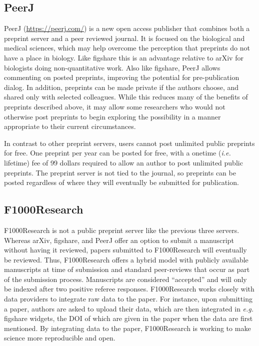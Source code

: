 \documentclass[letterpaper,twocolumn,superscriptaddress,showkeys,longbibliography]{revtex4-1}
\begin{document}
\subsection{PeerJ}

PeerJ (\href{https://peerj.com/}{https://peerj.com/}) is a new open access
publisher that combines both a preprint server and a peer reviewed journal.  It
is focused on the biological and medical sciences, which may help overcome the
perception that preprints do not have a place in biology. Like figshare this is
an advantage relative to arXiv for biologists doing non-quantitative work.  Also
like figshare, PeerJ allows commenting on posted preprints, improving the
potential for pre-publication dialog. In addition, preprints can be made private
if the authors choose, and shared only with selected colleagues. While this
reduces many of the benefits of preprints described above, it may allow some
researchers who would not otherwise post preprints to begin exploring the
possibility in a manner appropriate to their current circumstances.

In contrast to other preprint servers, users cannot post unlimited public
preprints for free. One preprint per year can be posted for free, with a onetime
(\emph{i.e.} lifetime) fee of 99 dollars required to allow an author to post unlimited
public preprints. The preprint server is not tied to the journal, so preprints
can be posted regardless of where they will eventually be submitted for
publication.

\subsection{F1000Research}\label{f1000r}

F1000Research is not a public preprint server like the previous three servers.
Whereas arXiv, figshare, and PeerJ offer an option to submit a manuscript
without having it reviewed, papers submitted to F1000Research will eventually
be reviewed. Thus, F1000Research offers a hybrid model with publicly available
manuscripts at time of submission and standard peer-reviews that occur as part
of the submission process. Manuscripts are considered ``accepted'' and will
only be indexed after two positive referee responses. F1000Research works
closely with data providers to integrate raw data to the paper. For instance,
upon submitting a paper, authors are asked to upload their data, which are then
integrated in \emph{e.g.} figshare widgets, the DOI of which are given in the
paper when the data are first mentioned.  By integrating data to the paper,
F1000Research is working to make science more reproducible and open.
\end{document}
